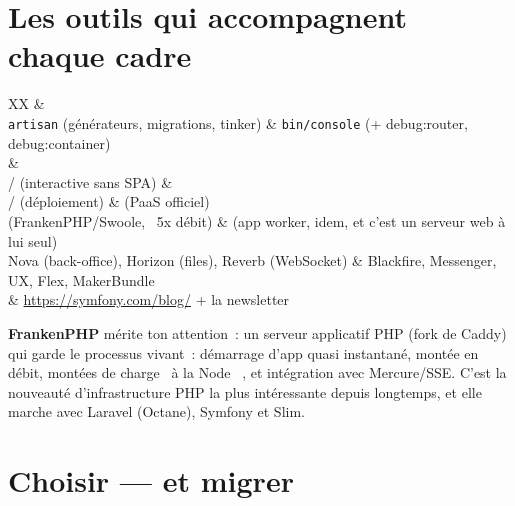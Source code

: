 \section{Les outils qui accompagnent chaque cadre}

\begin{tabz}{XX}
  \headrow {} \&  \\
  \midrule
  \verb|artisan| (g\'en\'erateurs, migrations, tinker) \& \verb|bin/console| (+ debug:router, debug:container) \\
   \&  \\
   /  (interactive sans SPA) \&  \\
   /  (d\'eploiement) \&  (PaaS officiel) \\
   (FrankenPHP/Swoole, ~5x d\'ebit) \&  (app worker, idem, et c'est un serveur web \`a lui seul) \\
  Nova (back-office), Horizon (files), Reverb (WebSocket) \& Blackfire, Messenger, UX, Flex, MakerBundle \\
   \& \url{https://symfony.com/blog/} + la newsletter \\
\end{tabz}

\begin{astuce}
\textbf{FrankenPHP} m\'erite ton attention~: un serveur applicatif PHP (fork de Caddy) qui garde le
processus vivant~: d\'emarrage d'app quasi instantan\'e, mont\'ee en d\'ebit, mont\'ees de charge \og ~\`a la
Node~ \fg{}, et int\'egration avec Mercure/SSE. C'est la nouveaut\'e d'infrastructure PHP la plus
int\'eressante depuis longtemps, et elle marche avec Laravel (Octane), Symfony et Slim.
\end{astuce}

\section{Choisir --- et migrer}

